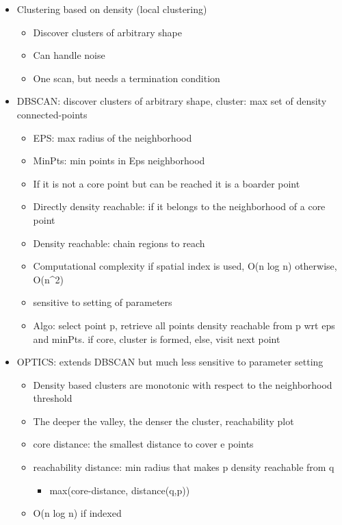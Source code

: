 \documentclass[11pt]{article}
\providecommand{\tightlist}{%
      \setlength{\itemsep}{0pt}\setlength{\parskip}{0pt}}
\begin{document}
    \begin{itemize}
\tightlist
\item
  Clustering based on density (local clustering)

  \begin{itemize}
  \tightlist
  \item
    Discover clusters of arbitrary shape
  \item
    Can handle noise
  \item
    One scan, but needs a termination condition
  \end{itemize}
\item
  DBSCAN: discover clusters of arbitrary shape, cluster: max set of
  density connected-points

  \begin{itemize}
  \tightlist
  \item
    EPS: max radius of the neighborhood
  \item
    MinPts: min points in Eps neighborhood
  \item
    If it is not a core point but can be reached it is a boarder point
  \item
    Directly density reachable: if it belongs to the neighborhood of a
    core point
  \item
    Density reachable: chain regions to reach
  \item
    Computational complexity if spatial index is used, O(n log n)
    otherwise, O(n\^{}2)
  \item
    sensitive to setting of parameters
  \item
    Algo: select point p, retrieve all points density reachable from p
    wrt eps and minPts. if core, cluster is formed, else, visit next
    point
  \end{itemize}
\end{itemize}

    \begin{itemize}
\tightlist
\item
  OPTICS: extends DBSCAN but much less sensitive to parameter setting

  \begin{itemize}
  \tightlist
  \item
    Density based clusters are monotonic with respect to the
    neighborhood threshold
  \item
    The deeper the valley, the denser the cluster, reachability plot
  \item
    core distance: the smallest distance to cover e points
  \item
    reachability distance: min radius that makes p density reachable
    from q

    \begin{itemize}
    \tightlist
    \item
      max(core-distance, distance(q,p))
    \end{itemize}
  \item
    O(n log n) if indexed
  \end{itemize}
\end{itemize}
\end{document}
